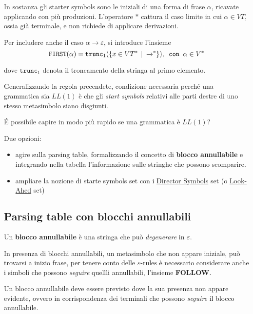 In sostanza gli starter symbols sono le iniziali di una forma di frase $\alpha$, ricavate applicando con più produzioni.
L'operatore $*$ cattura il caso limite in cui $\alpha \in VT$, ossia già terminale, e non richiede di applicare derivazioni.

Per includere anche il caso $\alpha \rightarrow \varepsilon$, si introduce l'insieme
\begin{equation*}
\texttt{FIRST}(\alpha ) = \texttt{trunc}_1(\{x \in VT^*\ |\ \xrightarrow{}\mathrel{\vphantom{\to}^*}\}), \texttt{ con } \alpha \in V^*
\end{equation*}

dove $\texttt{trunc}_1$ denota il troncamento della stringa al primo elemento.

Generalizzando la regola precendete, condizione necessaria perché una grammatica sia $LL(1)$ è che gli \textit{start symbols} relativi alle parti destre di uno stesso metasimbolo siano disgiunti.

É possibile capire in modo più rapido se una grammatica è $LL(1)$?

Due opzioni:
\begin{itemize}
    \item agire sulla parsing table, formalizzando il concetto di \textbf{blocco annullabile} e integrando nella tabella l'informazione sulle stringhe che possono scomparire.
    \item ampliare la nozione di starte symbols set con i \underline{Director Symbols} set (o \underline{Look-Ahed} set)
\end{itemize}

\subsection{Parsing table con blocchi annullabili}
Un \textbf{blocco annullabile} è una stringa che può \textit{degenerare} in $\varepsilon$.

In presenza di blocchi annullabili, un metasimbolo che non appare iniziale, può trovarsi a inizio frase, per tenere conto delle $\varepsilon \text{-rules}$ è necessario considerare anche i simboli che possono \textit{seguire} quellli annullabili, l'insieme \textbf{FOLLOW}.

Un blocco annullabile deve essere previsto dove la sua presenza non appare evidente, ovvero in corrispondenza dei terminali che possono \textit{seguire} il blocco annullabile.

